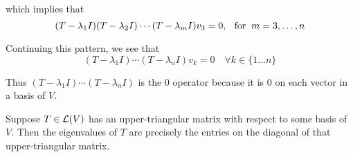 \begin{prf}
  which implies that
  \begin{equation}
    (T-\lambda_1 I) (T-\lambda_2 I) \cdots (T-\lambda_m I) v_3= 0, \;\;\, \text{for}\;\; m = 3, \ldots, n
  \end{equation}
  
  Continuing this pattern, we see that
  \begin{equation}
    (T-\lambda_1 I) \cdots (T- \lambda_n I) v_k = 0 \quad \forall k \in \{ 1\ldots n \}
  \end{equation}
  
  Thus $(T-\lambda_1 I) \cdots (T- \lambda_n I)$ is the $0$ operator because it is $0$ on each vector in a basis of $V$.
  
\end{prf}

\begin{thm}
  \label{thm:determination-of-eigenvalue-from-upper-triangular-matrix}
  Suppose $T\in \mathcal{L}(V)$ has an upper-triangular matrix with respect to some basis of $V$. Then the eigenvalues of $T$ are precisely the entries on the diagonal of that upper-triangular matrix.

\end{thm}
